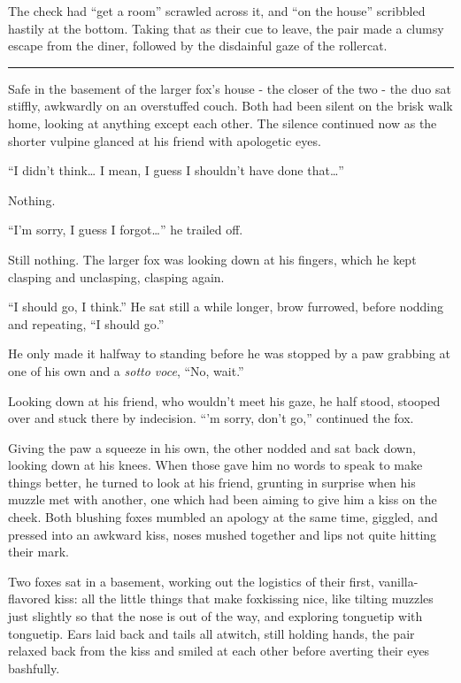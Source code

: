 The check had ``get a room'' scrawled across it, and ``on the house'' scribbled hastily at the bottom. Taking that as their cue to leave, the pair made a clumsy escape from the diner, followed by the disdainful gaze of the rollercat.

\begin{center}\rule{0.5\linewidth}{\linethickness}\end{center}

Safe in the basement of the larger fox's house - the closer of the two - the duo sat stiffly, awkwardly on an overstuffed couch. Both had been silent on the brisk walk home, looking at anything except each other. The silence continued now as the shorter vulpine glanced at his friend with apologetic eyes.

``I didn't think\ldots{} I mean, I guess I shouldn't have done that\ldots{}''

Nothing.

``I'm sorry, I guess I forgot\ldots{}'' he trailed off.

Still nothing. The larger fox was looking down at his fingers, which he kept clasping and unclasping, clasping again.

``I should go, I think.'' He sat still a while longer, brow furrowed, before nodding and repeating, ``I should go.''

He only made it halfway to standing before he was stopped by a paw grabbing at one of his own and a \emph{sotto voce}, ``No, wait.''

Looking down at his friend, who wouldn't meet his gaze, he half stood, stooped over and stuck there by indecision. ``'m sorry, don't go,'' continued the fox.

Giving the paw a squeeze in his own, the other nodded and sat back down, looking down at his knees. When those gave him no words to speak to make things better, he turned to look at his friend, grunting in surprise when his muzzle met with another, one which had been aiming to give him a kiss on the cheek. Both blushing foxes mumbled an apology at the same time, giggled, and pressed into an awkward kiss, noses mushed together and lips not quite hitting their mark.

Two foxes sat in a basement, working out the logistics of their first, vanilla-flavored kiss: all the little things that make foxkissing nice, like tilting muzzles just slightly so that the nose is out of the way, and exploring tonguetip with tonguetip. Ears laid back and tails all atwitch, still holding hands, the pair relaxed back from the kiss and smiled at each other before averting their eyes bashfully.

